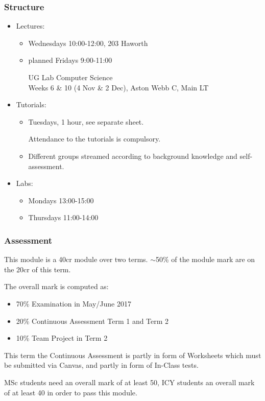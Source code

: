 \documentclass{beamer}
\def\mcolor#1#2{\rule{0ex}{0ex}\color{#1}#2\color{black}{}}
\begin{document}
\begin{frame}
\frametitle{Structure}
\begin{itemize}
\item \mcolor{blue}{Lectures:}
   \begin{itemize}
     \item Wednesdays 10:00-12:00, 203 Haworth
     \item planned Fridays 9:00-11:00 \mcolor{red}{UG Lab Computer Science}\\
          \hspace*{3ex}Weeks 6 \& 10 (4 Nov \& 2 Dec), Aston Webb C, Main LT
   \end{itemize}

\item\rule{0ex}{4ex} \mcolor{blue}{Tutorials:}
   \begin{itemize}
     \item Tuesdays, 1 hour, see separate sheet.\\
       \mcolor{red}{Attendance to the tutorials is compulsory.}
     \item Different groups streamed according to background knowledge
       and self-assessment.

   \end{itemize}
\item\rule{0ex}{4ex} \mcolor{blue}{Labs:}
   \begin{itemize}
     \item Mondays 13:00-15:00
     \item Thursdays 11:00-14:00
   \end{itemize}
\end{itemize}
\end{frame}

\begin{frame}
\frametitle{Assessment}
This module is a 40cr module over two terms. $\sim$50\% of the module mark are on the 20cr of this term. \bigskip

\mcolor{blue}{The overall mark is computed as:}
\begin{itemize}
\item  70\% Examination in May/June 2017
\item  20\% Continuous Assessment Term 1 and Term 2
\item  10\% Team Project in Term 2
\end{itemize}

This term the Continuous Assessment is partly in form of Worksheets
which must be submitted via Canvas, and partly in form of In-Class
tests.

MSc students need an overall mark of at least 50, ICY students an
overall mark of at least 40 in order to pass this module.
\end{frame}
\end{document}
